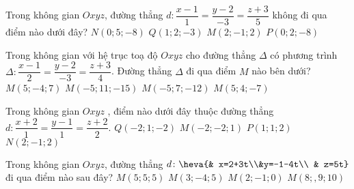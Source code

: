 \begin{ex}%
	Trong không gian $ Oxyz$, đường thẳng $ d\colon \dfrac{x-1}{1}=\dfrac{y-2}{-3}=\dfrac{z+3}{5}$ không đi qua điểm nào dưới đây?
	\choice
	{$ N(0;5;-8)$}
	{$ Q(1;2;-3)$}
	{$ M(2;-1;2)$}
	{\True $P(0;2;-8)$}
\end{ex}

\begin{ex}%
	Trong không gian với hệ trục toạ độ $Oxyz$ cho đường thẳng $\Delta $ có phương trình $\Delta \colon \dfrac{x-1}{2}=\dfrac{y-2}{-3}=\dfrac{z+3}{4}$. Đường thẳng $\Delta $ đi qua điểm $M$ nào bên dưới?
	\choice
	{$M\left(5;-4;7\right)$}
	{\True $M\left(-5;11;-15\right)$}
	{$M\left(-5;7;-12\right)$}
	{$M\left(5;4;-7\right)$}
\end{ex}

\begin{ex}%
	Trong không gian $Oxyz$ , điểm nào dưới đây thuộc đường thẳng $d\colon\dfrac{x+2}{1}=\dfrac{y-1}{1}=\dfrac{z+2}{2}$.
	\choice
	{\True $Q\left(-2;1;-2\right)$}
	{$M\left(-2;-2;1\right)$}
	{$P\left(1;1;2\right)$}
	{$N\left(2;-1;2\right)$}
\end{ex}

\begin{ex}%
	Trong không gian $ Oxyz$, đường thẳng $d\colon \heva{& x=2+3t\\&y=-1-4t\\ & z=5t}$ đi qua điểm nào sau đây?
	\choice
	{$M\left(5;5;5\right)$}
	{$M\left(3;-4;5\right)$}
	{\True $M\left(2;-1;0\right)$}
	{$M\left(8;,9;10\right)$}
\end{ex}

